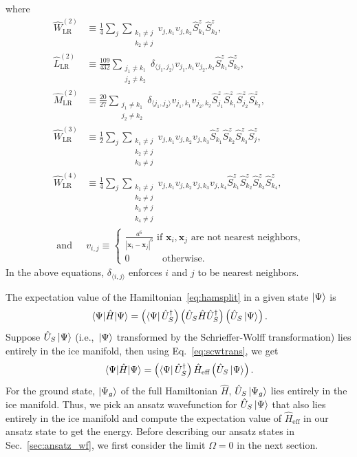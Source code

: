 \documentclass[twocolumn,superscriptaddress,amsmath,amssymb,aps,prx,nofootinbib]{revtex4-2}
\begin{document}
where 
\begin{align}
    \hat{W}^{(2)}_{\text{LR}}&\equiv \frac{1}{4}\sum_{j} \sum_{\substack{k_1\neq j \\ k_2\neq j}}v_{j,k_1} v_{j, k_2}\hat{S}^z_{k_1}\hat{S}^z_{k_2},\\
    \hat{L}^{(2)}_{\text{LR}}&\equiv \frac{109}{432}\sum_{\substack{j_1 \neq k_1 \\ j_2 \neq k_2}}\delta_{\langle j_1, j_2 \rangle}  v_{j_1,k_1} v_{j_2, k_2} \hat{S}^z_{k_1}\hat{S}^z_{k_2}, \\
    \hat{M}^{(2)}_{\text{LR}}&\equiv \frac{20}{27} \sum_{\substack{j_1 \neq k_1 \\ j_2 \neq k_2}}\delta_{\langle j_1, j_2 \rangle}  v_{j_1,k_1} v_{j_2, k_2} \hat{S}^z_{j_1}\hat{S}^z_{k_1}\hat{S}^z_{j_2}\hat{S}^z_{k_2}, \\
    \hat{W}^{(3)}_{\text{LR}}&\equiv \frac{1}{2}\sum_{j}\sum_{\substack{k_1 \neq j \\ k_2 \neq j \\ k_3 \neq j}}v_{j,k_1}v_{j, k_2} v_{j, k_3}\hat{S}^z_{k_1}\hat{S}^z_{k_2}\hat{S}^z_{k_3}\hat{S}^z_{j},\\
    \hat{W}^{(4)}_{\text{LR}}&\equiv \frac{1}{4}\sum_{j}\sum_{\substack{k_1 \neq j \\ k_2 \neq j \\ k_3 \neq j \\k_4 \neq j}}v_{j,k_1}v_{j, k_2} v_{j, k_3}v_{j, k_4}\hat{S}^z_{k_1}\hat{S}^z_{k_2}\hat{S}^z_{k_3}\hat{S}^z_{k_4},\\
    \text{ and } &v_{i,j} \equiv \begin{cases}\frac{a^6}{\left|\bm{x}_i - \bm{x}_j\right|^6} \text{ if }\bm{x}_i, \bm{x}_j \text{ are not nearest neighbors,}\\0 \;\;\;\;\;\;\;\;\;\;\;\text{ otherwise.}\end{cases}
\end{align}
In the above equations, $\delta_{\langle i,j \rangle}$ enforces $i$ and $j$ to be nearest neighbors.


The expectation value of the Hamiltonian~\eqref{eq:hamsplit} in a given state $\ket{\Psi}$ is 
\begin{equation}
    \mel{\Psi}{\hat{H}}{\Psi}=\left(\bra{\Psi}\hat{U}_S^\dagger\right)\left(\hat{U}_S \hat{H} \hat{U}_S^\dagger \right)\left(\hat{U}_S \ket{\Psi} \right).
\end{equation}
Suppose $\hat{U}_S \ket{\Psi} $ (i.e.,~$\ket{\Psi}$ transformed by the Schrieffer-Wolff transformation) lies entirely in the ice manifold, then using Eq.~\eqref{eq:scwtrans}, we get
\begin{equation}
    \mel{\Psi}{\hat{H}}{\Psi}= \left(\bra{\Psi}\hat{U}_S^\dagger\right) \hat{H}_{\text{eff}}\left(\hat{U}_S \ket{\Psi} \right).
\end{equation}
For the ground state, $\ket{\Psi_g}$ of the full Hamiltonian $\hat{H}$, $\hat{U}_S \ket{\Psi_g}$ lies entirely in the ice manifold. Thus, we pick an ansatz wavefunction for $\hat{U}_S \ket{\Psi}$ that also lies entirely in the ice manifold and compute the expectation value of $\hat{H}_{\text{eff}}$ in our ansatz state to get the energy. Before describing our ansatz states in Sec.~\ref{sec:ansatz_wf}, we first consider the limit $\Omega=0$ in the next section.
\end{document}
